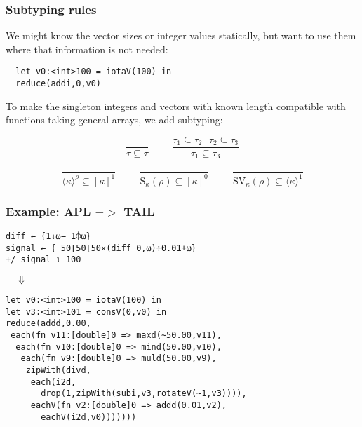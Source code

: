 \documentclass{beamer}
\newcommand{\A}[2]{[#1]^{#2}}
\newcommand{\V}[2]{\langle#1\rangle^{#2}}
\renewcommand{\S}[2]{\textrm{S}_{#1}(#2)}
\newcommand{\SV}[2]{\textrm{SV}_{#1}(#2)}
\begin{document}
\begin{frame}[fragile]
\frametitle{Subtyping rules}

We might know the vector sizes or integer values statically, but want
to use them where that information is not needed:

\begin{verbatim}
  let v0:<int>100 = iotaV(100) in
  reduce(addi,0,v0)
\end{verbatim}

To make the singleton integers and vectors with known length
compatible with functions taking general arrays, we add subtyping:

\begin{equation*}
\frac{}{\tau \subseteq \tau}\hspace{1cm}
\frac{\tau_1 \subseteq \tau_2 ~~~ \tau_2 \subseteq \tau_3}{\tau_1 \subseteq \tau_3}
\end{equation*}

\begin{equation*}
\frac{}{\V{\kappa}{\rho} \subseteq \A{\kappa}{1}}\hspace{1cm}
\frac{}{\S{\kappa}{\rho} \subseteq \A{\kappa}{0}}\hspace{1cm}
\frac{}{\SV{\kappa}{\rho} \subseteq \V{\kappa}{1}}
\end{equation*}


\end{frame}

\begin{frame}[fragile]
\frametitle{Example: APL $->$ TAIL}


\begin{verbatim}
diff ← {1↓⍵−¯1⌽⍵}
signal ← {¯50⌈50⌊50×(diff 0,⍵)÷0.01+⍵}
+/ signal ⍳ 100
\end{verbatim}

\pause
$\quad\Downarrow$

\footnotesize
\begin{verbatim}
let v0:<int>100 = iotaV(100) in
let v3:<int>101 = consV(0,v0) in
reduce(addd,0.00,
 each(fn v11:[double]0 => maxd(~50.00,v11),
  each(fn v10:[double]0 => mind(50.00,v10),
   each(fn v9:[double]0 => muld(50.00,v9),
    zipWith(divd,
     each(i2d,
       drop(1,zipWith(subi,v3,rotateV(~1,v3)))),
     eachV(fn v2:[double]0 => addd(0.01,v2),
       eachV(i2d,v0)))))))
\end{verbatim}
\end{frame}
\end{document}
